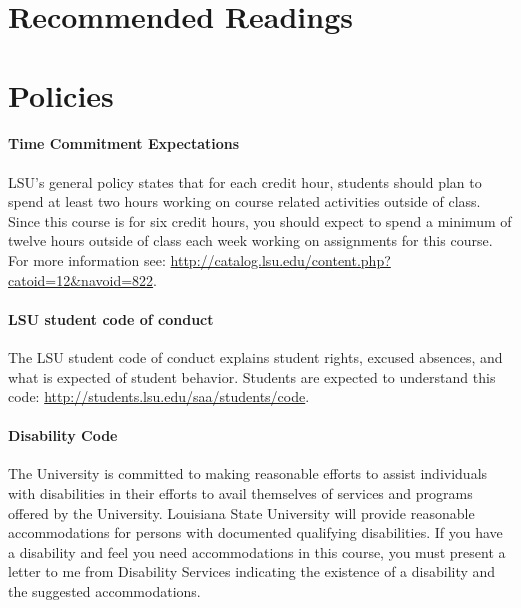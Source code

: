 \documentclass[11pt,article,oneside]{memoir}
\begin{document}
\section{Recommended Readings}
\vspace*{0.5cm}
\nocite{*}
\setlength{}
\printbibliography[keyword=recommended, heading=none]


\section{Policies}

\paragraph{Time Commitment Expectations}
LSU's general policy states that for each credit hour,  students should plan to
spend at least two hours working on course related activities outside of class. Since this course is for six credit hours, you should expect to spend a minimum of twelve hours outside of class each week working on assignments for this course. For more information see: 
\url{http://catalog.lsu.edu/content.php?catoid=12&navoid=822}.

\paragraph{LSU student code of conduct}
The LSU student code of conduct explains student rights, excused absences, and what is expected of student behavior. Students are expected to understand this code:  \url{http://students.lsu.edu/saa/students/code}.

\paragraph{Disability Code}
The University is committed to making reasonable efforts to assist individuals with disabilities in
their efforts to avail themselves of services and programs offered by the University. 
Louisiana State University will provide reasonable accommodations for persons with
documented qualifying disabilities. If you have a disability and feel you need accommodations in
this course, you must present a letter to me from Disability Services %
indicating the existence of a disability and the suggested accommodations.
\end{document}
